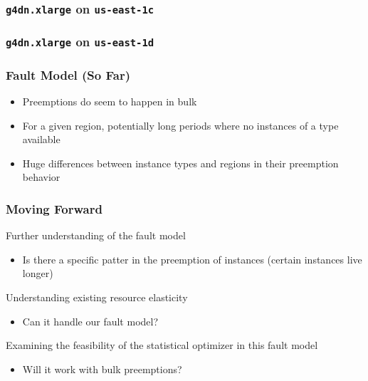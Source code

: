   \begin{frame}
    \frametitle{\texttt{g4dn.xlarge} on \texttt{us-east-1c}}
    \begin{center}
      
    \end{center}
  \end{frame}

  \begin{frame}
    \frametitle{\texttt{g4dn.xlarge} on \texttt{us-east-1d}}
    \begin{center}
      
    \end{center}
  \end{frame}

  \begin{frame}
    \frametitle{Fault Model (So Far)}
    \begin{itemize}
      \item Preemptions do seem to happen in bulk
      \item For a given region, potentially long periods where no instances of a type available
      \item Huge differences between instance types and regions in their preemption behavior
    \end{itemize}
  \end{frame}

  \begin{frame}
    \frametitle{Moving Forward}

    Further understanding of the fault model
    \begin{itemize}
      \item Is there a specific patter in the preemption of instances (certain instances live longer)
    \end{itemize}

    Understanding existing resource elasticity
    \begin{itemize}
      \item Can it handle our fault model?
    \end{itemize}

    Examining the feasibility of the statistical optimizer in this fault model
    \begin{itemize}
      \item Will it work with bulk preemptions?
    \end{itemize}

  \end{frame}


